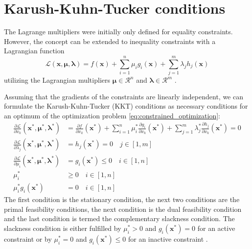 \section{Karush-Kuhn-Tucker conditions}
The Lagrange multipliers were initially only defined for equality constraints. However, the concept can be extended to inequality constraints with a Lagrangian function 
\begin{equation}
    \mathcal{L} (\mathbf{x}, \pmb{\mu}, \pmb{\lambda}) = f(\mathbf{x}) + \sum_{i=1}^n \mu_i g_i(\mathbf{x}) + \sum_{j=1}^m \lambda_j h_j(\mathbf{x}) 
\end{equation}
utilizing the Lagrangian multipliers $\pmb{\mu} \in \mathcal{R}^n$ and $\pmb{\lambda} \in \mathcal{R}^m$ \cite{Karush1939, Kuhn1951}.

Assuming that the gradients of the constraints are linearly independent, we can formulate the Karush-Kuhn-Tucker (KKT) conditions as necessary conditions for an optimum of the optimization problem \eqref{eq:constrained_optimization}: 
\begin{align}
    \frac{\partial \mathcal{L}}{\partial x_k} (\mathbf{x}^*, \pmb{\mu}^*, \pmb{\lambda}^*) &= 
    \frac{\partial f }{\partial x_k} (\mathbf{x}^*) + \sum_{i=1}^n \mu_i^* \frac{\partial g_i}{\partial x_k} (\mathbf{x}^*) + \sum_{j=1}^m \lambda_j^* \frac{\partial h_j}{\partial x_k} (\mathbf{x}^*) = 0 \\
    \frac{\partial \mathcal{L}}{\partial \lambda_j} (\mathbf{x}^*, \pmb{\mu}^*, \pmb{\lambda}^*) &= h_j(\mathbf{x}^*) = 0 \quad j \in [1,m]\\
    \frac{\partial \mathcal{L}}{\partial \mu_i} (\mathbf{x}^*, \pmb{\mu}^*, \pmb{\lambda}^*) &= g_i(\mathbf{x}^*) \le 0 \quad i \in [1,n]\\
    \mu_i^* &\ge 0 \quad i \in [1,n] \\
    \mu_i^* g_i(\mathbf{x}^*) &=0 \quad i \in [1,n]
\end{align}
The first condition is the stationary condition, the next two conditions are the primal feasibility conditions, the next condition is the dual feasibility condition and the last condition is termed the complementary slackness condition. The slackness condition is either fulfilled by $\mu_i^*>0$ and $g_i(\mathbf{x}^*)=0$ for an active constraint or by  $\mu_i^*=0$ and $g_i(\mathbf{x}^*) \le 0$ for an inactive constraint \cite{Christensen2008, Harzheim2014}.

